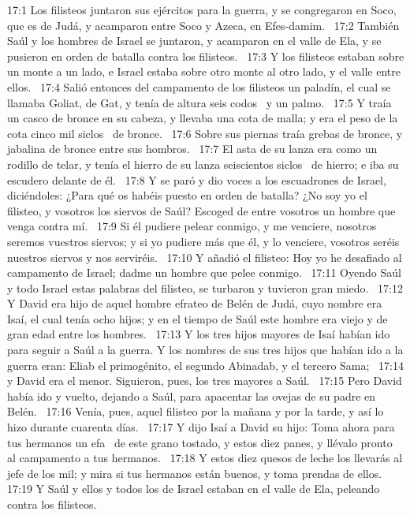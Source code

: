17:1 Los filisteos juntaron sus ejércitos para la guerra, y se congregaron en Soco, que es de Judá, y acamparon entre Soco y Azeca, en Efes-damim.  
17:2 También Saúl y los hombres de Israel se juntaron, y acamparon en el valle de Ela, y se pusieron en orden de batalla contra los filisteos.  
17:3 Y los filisteos estaban sobre un monte a un lado, e Israel estaba sobre otro monte al otro lado, y el valle entre ellos.  
17:4 Salió entonces del campamento de los filisteos un paladín, el cual se llamaba Goliat, de Gat, y tenía de altura seis codos  y un palmo.  
17:5 Y traía un casco de bronce en su cabeza, y llevaba una cota de malla; y era el peso de la cota cinco mil siclos  de bronce.  
17:6 Sobre sus piernas traía grebas de bronce, y jabalina de bronce entre sus hombros.  
17:7 El asta de su lanza era como un rodillo de telar, y tenía el hierro de su lanza seiscientos siclos  de hierro; e iba su escudero delante de él.  
17:8 Y se paró y dio voces a los escuadrones de Israel, diciéndoles: ¿Para qué os habéis puesto en orden de batalla? ¿No soy yo el filisteo, y vosotros los siervos de Saúl? Escoged de entre vosotros un hombre que venga contra mí.  
17:9 Si él pudiere pelear conmigo, y me venciere, nosotros seremos vuestros siervos; y si yo pudiere más que él, y lo venciere, vosotros seréis nuestros siervos y nos serviréis.  
17:10 Y añadió el filisteo: Hoy yo he desafiado al campamento de Israel; dadme un hombre que pelee conmigo.  
17:11 Oyendo Saúl y todo Israel estas palabras del filisteo, se turbaron y tuvieron gran miedo.  
17:12 Y David era hijo de aquel hombre efrateo de Belén de Judá, cuyo nombre era Isaí, el cual tenía ocho hijos; y en el tiempo de Saúl este hombre era viejo y de gran edad entre los hombres.  
17:13 Y los tres hijos mayores de Isaí habían ido para seguir a Saúl a la guerra. Y los nombres de sus tres hijos que habían ido a la guerra eran: Eliab el primogénito, el segundo Abinadab, y el tercero Sama;  
17:14 y David era el menor. Siguieron, pues, los tres mayores a Saúl.  
17:15 Pero David había ido y vuelto, dejando a Saúl, para apacentar las ovejas de su padre en Belén.  
17:16 Venía, pues, aquel filisteo por la mañana y por la tarde, y así lo hizo durante cuarenta días.  
17:17 Y dijo Isaí a David su hijo: Toma ahora para tus hermanos un efa  de este grano tostado, y estos diez panes, y llévalo pronto al campamento a tus hermanos.  
17:18 Y estos diez quesos de leche los llevarás al jefe de los mil; y mira si tus hermanos están buenos, y toma prendas de ellos.  
17:19 Y Saúl y ellos y todos los de Israel estaban en el valle de Ela, peleando contra los filisteos.  
